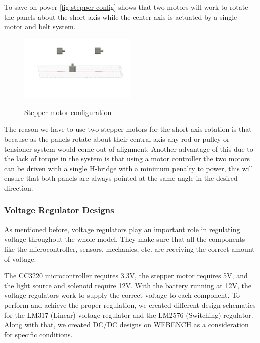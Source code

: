 To save on power \autoref{fig:stepper-config} shows that two motors will work to rotate the panels about the short axis while the center axis is actuated by a single motor and belt system.
\begin{figure}[H]
    \centering
    \caption{Stepper motor configuration}
    \includegraphics[width=0.5\textwidth]{images/stepper-config.png}
    \label{fig:stepper-config}
\end{figure}
The reason we have to use two stepper motors for the short axis rotation is that because as the panels rotate about their central axis any rod or pulley or tensioner system would come out of alignment. Another advantage of this due to the lack of torque in the system is that using a motor controller the two motors can be driven with a single H-bridge with a minimum penalty to power, this will ensure that both panels are always pointed at the same angle in the desired direction.\par
\subsubsection{Voltage Regulator Designs}
As mentioned before, voltage regulators play an important role in regulating voltage throughout the whole model. They make sure that all the components like the microcontroller, sensors, mechanics, etc. are receiving the correct amount of voltage.\par
The CC3220 microcontroller requires 3.3V, the stepper motor requires 5V, and the light source and solenoid require 12V. With the battery running at 12V, the voltage regulators work to supply the correct voltage to each component. To perform and achieve the proper regulation, we created different design schematics for the LM317 (Linear) voltage regulator and the LM2576 (Switching) regulator. Along with that, we created DC/DC designs on WEBENCH as a consideration for specific conditions.\par
